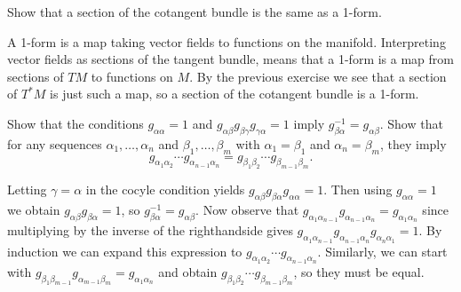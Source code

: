 \begin{p}%
{Show that a section of the cotangent bundle is the same as a 1-form.}
\end{p}
{A 1-form is a
map taking vector fields to functions on the manifold. Interpreting vector fields as sections of
the tangent bundle, means that a 1-form is a map from sections of $TM$ to functions on $M$. By the
previous exercise we see that a section of $T^*M$ is just such a map, so a section of the cotangent
bundle is a 1-form.}

\setcounter{p}{76}

\begin{p}%
{Show that the conditions $g_{\alpha\alpha}=1$ and $g_{\alpha\beta}g_{\beta\gamma}g_{\gamma\alpha}=1$ imply $g_{\beta\alpha}^{-1}=g_{\alpha\beta}$. Show that for any sequences $\alpha_1,\dots,\alpha_n$ and $\beta_1,\dots,\beta_m$ with $\alpha_1=\beta_1$ and $\alpha_n=\beta_m$, they 
imply $$g_{\alpha_1\alpha_2}\cdots g_{\alpha_{n-1}\alpha_n}=g_{\beta_1\beta_2}\cdots g_{\beta_{m-1}\beta_m}.$$
}
\end{p}
{Letting $\gamma=\alpha$ in the cocyle condition yields $g_{\alpha\beta}g_{\beta\alpha}g_{\alpha\alpha}=1$. Then using $g_{\alpha\alpha}=1$ we obtain
$g_{\alpha\beta}g_{\beta\alpha}=1$, so $g_{\beta\alpha}^{-1}=g_{\alpha\beta}$. Now
observe that $g_{\alpha_1\alpha_{n-1}}g_{\alpha_{n-1}\alpha_n}=g_{\alpha_1\alpha_n}$ since
multiplying by the inverse of the righthandside gives $g_{\alpha_1\alpha_{n-1}}g_{\alpha_{n-1}\alpha_n}g_{\alpha_n\alpha_1}=1$. By induction we can expand this expression to
$g_{\alpha_1\alpha_2}\cdots g_{\alpha_{n-1}\alpha_n}$. Similarly, we can start with
$g_{\beta_1\beta_{m-1}}g_{\alpha_{m-1}\beta_m}=g_{\alpha_1\alpha_n}$ and obtain $g_{\beta_1\beta_2}\cdots g_{\beta_{m-1}\beta_m}$, so they must be equal.}


\newpage






